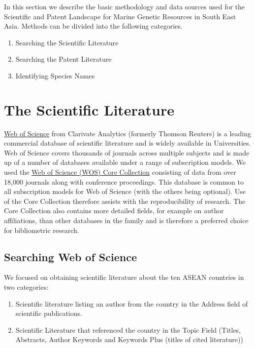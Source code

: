 \documentclass[]{book}
\providecommand{\tightlist}{%
  \setlength{\itemsep}{0pt}\setlength{\parskip}{0pt}}
\theoremstyle{definition}
\theoremstyle{definition}
\theoremstyle{definition}
\theoremstyle{remark}
\begin{document}
In this section we describe the basic methodology and data sources used
for the Scientific and Patent Landscape for Marine Genetic Resources in
South East Asia. Methods can be divided into the following categories.

\begin{enumerate}
\def\labelenumi{\arabic{enumi}.}
\tightlist
\item
  Searching the Scientific Literature
\item
  Searching the Patent Literature
\item
  Identifying Species Names
\end{enumerate}

\hypertarget{the-scientific-literature}{%
\section{The Scientific Literature}\label{the-scientific-literature}}

\href{https://clarivate.com/products/web-of-science/web-science-form/web-science-core-collection/}{Web
of Science} from Clarivate Analytics (formerly Thomson Reuters) is a
leading commercial database of scientific literature and is widely
available in Universities. Web of Science covers thousands of journals
across multiple subjects and is made up of a number of databases
available under a range of subscription models. We used the
\href{https://clarivate.com/products/web-of-science/web-science-form/web-science-core-collection/}{Web
of Science (WOS) Core Collection} consisting of data from over 18,000
journals along with conference proceedings. This database is common to
all subscription models for Web of Science (with the others being
optional). Use of the Core Collection therefore assists with the
reproducibility of research. The Core Collection also contains more
detailed fields, for example on author affiliations, than other
databases in the family and is therefore a preferred choice for
bibliometric research.

\hypertarget{searching-web-of-science}{%
\subsection{Searching Web of Science}\label{searching-web-of-science}}

We focused on obtaining scientific literature about the ten ASEAN
countries in two categories:

\begin{enumerate}
\def\labelenumi{\arabic{enumi}.}
\tightlist
\item
  Scientific literature listing an author from the country in the
  Address field of scientific publications.
\item
  Scientific Literature that referenced the country in the Topic Field
  (Titles, Abstracts, Author Keywords and Keywords Plus (titles of cited
  literature))
\end{enumerate}
\end{document}
